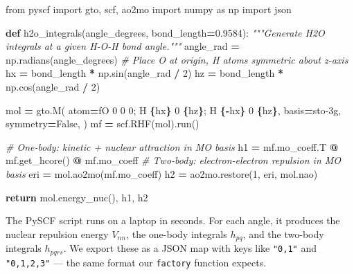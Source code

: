 \documentclass[
  11pt,
  oneside]{book}
\newenvironment{Shaded}{\begin{snugshade}}{\end{snugshade}}
\newcommand{\CommentTok}[1]{\textcolor[rgb]{0.56,0.35,0.01}{\textit{#1}}}
\newcommand{\ControlFlowTok}[1]{\textcolor[rgb]{0.13,0.29,0.53}{\textbf{#1}}}
\newcommand{\DecValTok}[1]{\textcolor[rgb]{0.00,0.00,0.81}{#1}}
\newcommand{\FloatTok}[1]{\textcolor[rgb]{0.00,0.00,0.81}{#1}}
\newcommand{\ImportTok}[1]{#1}
\newcommand{\KeywordTok}[1]{\textcolor[rgb]{0.13,0.29,0.53}{\textbf{#1}}}
\newcommand{\NormalTok}[1]{#1}
\newcommand{\OperatorTok}[1]{\textcolor[rgb]{0.81,0.36,0.00}{\textbf{#1}}}
\newcommand{\SpecialCharTok}[1]{\textcolor[rgb]{0.81,0.36,0.00}{\textbf{#1}}}
\newcommand{\SpecialStringTok}[1]{\textcolor[rgb]{0.31,0.60,0.02}{#1}}
\newcommand{\StringTok}[1]{\textcolor[rgb]{0.31,0.60,0.02}{#1}}
\newcommand{\VariableTok}[1]{\textcolor[rgb]{0.00,0.00,0.00}{#1}}
\begin{document}
\begin{Shaded}
\begin{Highlighting}[]
\ImportTok{from}\NormalTok{ pyscf }\ImportTok{import}\NormalTok{ gto, scf, ao2mo}
\ImportTok{import}\NormalTok{ numpy }\ImportTok{as}\NormalTok{ np}
\ImportTok{import}\NormalTok{ json}

\KeywordTok{def}\NormalTok{ h2o\_integrals(angle\_degrees, bond\_length}\OperatorTok{=}\FloatTok{0.9584}\NormalTok{):}
    \CommentTok{"""Generate H2O integrals at a given H{-}O{-}H bond angle."""}
\NormalTok{    angle\_rad }\OperatorTok{=}\NormalTok{ np.radians(angle\_degrees)}
    \CommentTok{\# Place O at origin, H atoms symmetric about z{-}axis}
\NormalTok{    hx }\OperatorTok{=}\NormalTok{ bond\_length }\OperatorTok{*}\NormalTok{ np.sin(angle\_rad }\OperatorTok{/} \DecValTok{2}\NormalTok{)}
\NormalTok{    hz }\OperatorTok{=}\NormalTok{ bond\_length }\OperatorTok{*}\NormalTok{ np.cos(angle\_rad }\OperatorTok{/} \DecValTok{2}\NormalTok{)}

\NormalTok{    mol }\OperatorTok{=}\NormalTok{ gto.M(}
\NormalTok{        atom}\OperatorTok{=}\SpecialStringTok{f\textquotesingle{}O 0 0 0; H }\SpecialCharTok{\{}\NormalTok{hx}\SpecialCharTok{\}}\SpecialStringTok{ 0 }\SpecialCharTok{\{}\NormalTok{hz}\SpecialCharTok{\}}\SpecialStringTok{; H }\SpecialCharTok{\{}\OperatorTok{{-}}\NormalTok{hx}\SpecialCharTok{\}}\SpecialStringTok{ 0 }\SpecialCharTok{\{}\NormalTok{hz}\SpecialCharTok{\}}\SpecialStringTok{\textquotesingle{}}\NormalTok{,}
\NormalTok{        basis}\OperatorTok{=}\StringTok{\textquotesingle{}sto{-}3g\textquotesingle{}}\NormalTok{,}
\NormalTok{        symmetry}\OperatorTok{=}\VariableTok{False}\NormalTok{,}
\NormalTok{    )}
\NormalTok{    mf }\OperatorTok{=}\NormalTok{ scf.RHF(mol).run()}

    \CommentTok{\# One{-}body: kinetic + nuclear attraction in MO basis}
\NormalTok{    h1 }\OperatorTok{=}\NormalTok{ mf.mo\_coeff.T }\OperatorTok{@}\NormalTok{ mf.get\_hcore() }\OperatorTok{@}\NormalTok{ mf.mo\_coeff}
    \CommentTok{\# Two{-}body: electron{-}electron repulsion in MO basis}
\NormalTok{    eri }\OperatorTok{=}\NormalTok{ mol.ao2mo(mf.mo\_coeff)}
\NormalTok{    h2 }\OperatorTok{=}\NormalTok{ ao2mo.restore(}\DecValTok{1}\NormalTok{, eri, mol.nao)}

    \ControlFlowTok{return}\NormalTok{ mol.energy\_nuc(), h1, h2}
\end{Highlighting}
\end{Shaded}

The PySCF script runs on a laptop in seconds. For each angle, it
produces the nuclear repulsion energy \(V_{nn}\), the one-body integrals
\(h_{pq}\), and the two-body integrals \(h_{pqrs}\). We export these as
a JSON map with keys like \texttt{"0,1"} and \texttt{"0,1,2,3"} --- the
same format our \texttt{factory} function expects.
\end{document}
